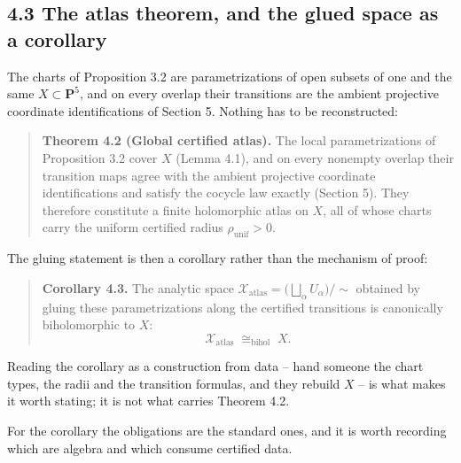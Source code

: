 \subsection{4.3 The atlas theorem, and the glued space as a corollary}\label{the-atlas-theorem-and-the-glued-space-as-a-corollary}

The charts of Proposition 3.2 are parametrizations of open subsets of one and the same \(X \subset \mathbf{P}^5\), and on every overlap their transitions are the ambient projective coordinate identifications of Section 5. Nothing has to be reconstructed:

\begin{quote}
\textbf{Theorem 4.2 (Global certified atlas).} The local parametrizations of Proposition 3.2 cover \(X\) (Lemma 4.1), and on every nonempty overlap their transition maps agree with the ambient projective coordinate identifications and satisfy the cocycle law exactly (Section 5). They therefore constitute a finite holomorphic atlas on \(X\), all of whose charts carry the uniform certified radius \(\rho_{\mathrm{unif}} > 0\).
\end{quote}

The gluing statement is then a corollary rather than the mechanism of proof:

\begin{quote}
\textbf{Corollary 4.3.} The analytic space \(\mathcal{X}_{\mathrm{atlas}} = \big(\bigsqcup_\alpha U_\alpha\big)/\sim\) obtained by gluing these parametrizations along the certified transitions is canonically biholomorphic to \(X\): \[\boxed{\;\mathcal{X}_{\mathrm{atlas}} \;\cong_{\mathrm{bihol}}\; X.\;}\]
\end{quote}

Reading the corollary as a construction from data -- hand someone the chart types, the radii and the transition formulas, and they rebuild \(X\) -- is what makes it worth stating; it is not what carries Theorem 4.2.

For the corollary the obligations are the standard ones, and it is worth recording which are algebra and which consume certified data.

